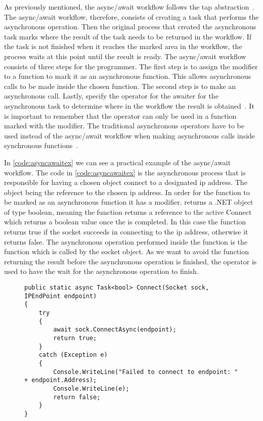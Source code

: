 As previously mentioned, the async/await workflow follows the \ac{tap} abstraction~\cite{DOC:TaskAsyncProgModel}.  The async/await workflow, therefore, consists of creating a task that performs the asynchronous operation. Then the original process that created the asynchronous task marks where the result of the task needs to be returned in the workflow. If the task is not finished when it reaches the marked area in the workflow, the process waits at this point until the result is ready. 
The async/await workflow consists of three steps for the programmer. The first step is to assign the  modifier to a function to mark it as an asynchronous function. This allows asynchronous calls to be made inside the chosen function. The second step is to make an asynchronous call. Lastly, specify the  operator for the awaiter for the asynchronous task to determine where in the workflow the result is obtained~\cite{WEB:AsyncAwaitTut, DOC:AsyncAwait, VIDEO:AsyncConBack}.
It is important to remember that the  operator can only be used in a function marked with the  modifier. The traditional asynchronous operators have to be used instead of the async/await workflow when making asynchronous calls inside synchronous functions~\cite{DOC:AsyncAwait, DOC:TaskAsyncProgModel}.

In \autoref{code:asyncawaitex} we can see a practical example of the async/await workflow.
The code in \autoref{code:asyncawaitex} is the asynchronous process that is responsible for having a chosen  object connect to a designated \ac{ip} address. The  object being the reference to the chosen \ac{ip} address. In order for the  function to be marked as an asynchronous function it has a  modifier.  returns a .NET  object of type boolean, meaning the function returns a reference to the active Connect  which returns a boolean value once the  is completed. In this case the  function returns true if the socket succeeds in connecting to the \ac{ip} address, otherwise it returns false. The asynchronous operation performed inside the  function is the  function which is called by the socket object. As we want to avoid the function returning the result before the asynchronous operation is finished, the  operator is used to have the  wait for the   asynchronous operation to finish.

\begin{figure}[h]
	\centering
	\begin{lstlisting}[label = code:asyncawaitex, caption=Example of async/await workflow, captionpos=b, basicstyle=\scriptsize]
public static async Task<bool> Connect(Socket sock, IPEndPoint endpoint)
{
    try
    {
        await sock.ConnectAsync(endpoint);
        return true;
    }
    catch (Exception e)
    {
        Console.WriteLine("Failed to connect to endpoint: " + endpoint.Address);
        Console.WriteLine(e);
        return false;
    }
}
	\end{lstlisting}
\end{figure}

